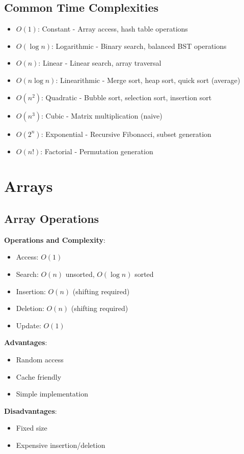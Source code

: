 \documentclass[12pt,a4paper]{report}
\begin{document}
\subsection{Common Time Complexities}
\begin{concept}
\begin{itemize}
    \item $O(1)$: Constant - Array access, hash table operations
    \item $O(\log n)$: Logarithmic - Binary search, balanced BST operations
    \item $O(n)$: Linear - Linear search, array traversal
    \item $O(n \log n)$: Linearithmic - Merge sort, heap sort, quick sort (average)
    \item $O(n^2)$: Quadratic - Bubble sort, selection sort, insertion sort
    \item $O(n^3)$: Cubic - Matrix multiplication (naive)
    \item $O(2^n)$: Exponential - Recursive Fibonacci, subset generation
    \item $O(n!)$: Factorial - Permutation generation
\end{itemize}
\end{concept}

\section{Arrays}

\subsection{Array Operations}
\begin{concept}
\textbf{Operations and Complexity}:
\begin{itemize}
    \item Access: $O(1)$
    \item Search: $O(n)$ unsorted, $O(\log n)$ sorted
    \item Insertion: $O(n)$ (shifting required)
    \item Deletion: $O(n)$ (shifting required)
    \item Update: $O(1)$
\end{itemize}

\textbf{Advantages}:
\begin{itemize}
    \item Random access
    \item Cache friendly
    \item Simple implementation
\end{itemize}

\textbf{Disadvantages}:
\begin{itemize}
    \item Fixed size
    \item Expensive insertion/deletion
\end{itemize}
\end{concept}
\end{document}
